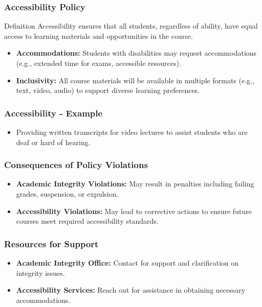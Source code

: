\documentclass[aspectratio=169]{beamer}
\begin{document}
\begin{frame}[fragile]
    \frametitle{Accessibility Policy}
    \begin{block}{Definition}
        Accessibility ensures that all students, regardless of ability, have equal access to learning materials and opportunities in the course.
    \end{block}
    \begin{itemize}
        \item \textbf{Accommodations:} Students with disabilities may request accommodations (e.g., extended time for exams, accessible resources).
        \item \textbf{Inclusivity:} All course materials will be available in multiple formats (e.g., text, video, audio) to support diverse learning preferences.
    \end{itemize}
\end{frame}

\begin{frame}[fragile]
    \frametitle{Accessibility - Example}
    \begin{itemize}
        \item Providing written transcripts for video lectures to assist students who are deaf or hard of hearing.
    \end{itemize}
\end{frame}

\begin{frame}[fragile]
    \frametitle{Consequences of Policy Violations}
    \begin{itemize}
        \item \textbf{Academic Integrity Violations:} May result in penalties including failing grades, suspension, or expulsion.
        \item \textbf{Accessibility Violations:} May lead to corrective actions to ensure future courses meet required accessibility standards.
    \end{itemize}
\end{frame}

\begin{frame}[fragile]
    \frametitle{Resources for Support}
    \begin{itemize}
        \item \textbf{Academic Integrity Office:} Contact for support and clarification on integrity issues.
        \item \textbf{Accessibility Services:} Reach out for assistance in obtaining necessary accommodations.
    \end{itemize}
\end{frame}
\end{document}
